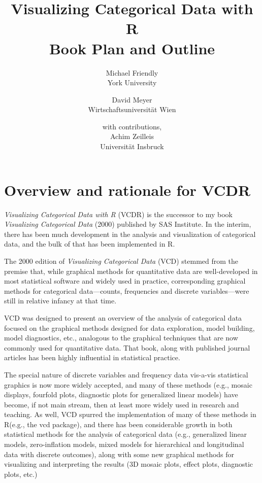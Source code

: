 \documentclass{article}
\newcommand{\VCD}{\textsf{VCD}\xspace}
\newcommand{\VCDR}{\textsf{VCDR}\xspace}
\newcommand{\R}{\textsf{R}\xspace}
\newcommand{\pkg}[1]{{\normalfont\fontseries{b}\selectfont #1}}
\begin{document}
\begin{titlepage}
\title{\Huge{Visualizing Categorical Data with \R} \\[1ex]
 \Large{Book Plan and Outline}}
\author{
	Michael Friendly \\ York University
	\and
	David Meyer \\ Wirtschaftsuniversit\"at Wien
	\and
	with contributions, \\ Achim Zeilleis \\ Universit\"at Insbruck
}
\end{titlepage}
\maketitle

\section*{Overview and rationale for \VCDR}

\emph{Visualizing Categorical Data with \R}
(VCDR) is the successor to my
book \emph{Visualizing Categorical Data} (2000) published by
SAS Institute.  In the interim, there has been much development in the
analysis and visualization of categorical data, and the bulk of that
has been implemented in \R.

The 2000 edition of \emph{Visualizing Categorical Data} (\VCD) stemmed from the
premise that, while graphical methods for quantitative data are
well-developed in most statistical software and widely used in practice,
corresponding graphical methods for categorical data---counts, frequencies
and discrete variables---were still in relative infancy at that time.

\VCD was designed to present an overview of the analysis of categorical data
focused on the graphical methods designed for data exploration, model building,
model diagnostics, etc., analogous to the graphical techniques that are now
commonly used for quantitative data.  That book, along with published journal
articles \citep[e.g.,][]{Friendly:94a,Friendly:99b,Emerson-etal:2013}
has been highly influential in statistical practice.

The special nature of discrete variables
and frequency data vis-a-vis statistical graphics is now more widely accepted,
and many of these methods (e.g., mosaic displays, fourfold plots, diagnostic
plots for generalized linear models) have become, if not main stream, then at
least more widely used in research and teaching.  As well, \VCD spurred the
implementation of many of these methods in \R (e.g., the \pkg{vcd} package),
and there has been considerable growth in both statistical methods for the
analysis of categorical data (e.g., generalized linear models, zero-inflation
models, mixed models for hierarchical and longitudinal data with discrete
outcomes), along with some new graphical methods for visualizing and
interpreting the results (3D mosaic plots, effect plots, diagnostic plots, etc.)
\end{document}
